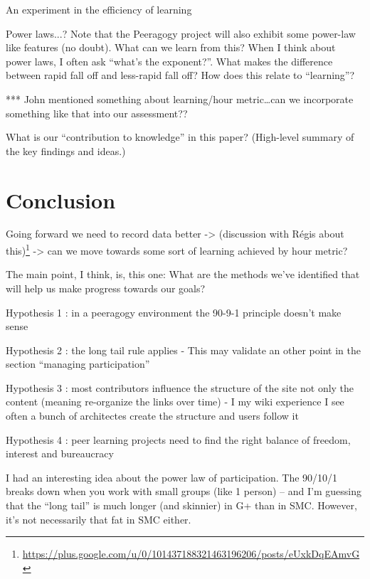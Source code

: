 \documentclass{acm_proc_article-sp}
\begin{document}
    An experiment in the efficiency of learning

        Power laws...? Note that the Peeragogy project will also exhibit some power-law like features (no doubt). What can we learn from this? When I think about power laws, I often ask ``what's the exponent?''. What makes the difference between rapid fall off and less-rapid fall off? How does this relate to ``learning''?

*** John mentioned something about learning/hour metric\ldots can we incorporate something like that into our assessment??

        What is our ``contribution to knowledge'' in this paper? (High-level summary of the key findings and ideas.)\cite{paragogy}
\cite{Origins}
\cite{Tales}
\cite{Peeragogy-2}
\cite{College}
\cite{Bridges}
\cite{peer}
\cite{Gluing}
\cite{GroupInformatics}
\cite{Why}
\cite{PeeragogyinAction}

%
%
%
%

\section{Conclusion}

Going forward we need to record data better -> (discussion with R\'egis about this)\footnote{\url{https://plus.google.com/u/0/101437188321463196206/posts/eUxkDqEAmvG}} -> can we move towards some sort of learning achieved by hour metric?

    The main point, I think, is, this one: What are the methods we've identified that will help us make progress towards our goals?

                Hypothesis 1 : in a peeragogy environment the 90-9-1 principle doesn't make sense

                Hypothesis 2 : the long tail rule applies - This may validate an other point in the section ``managing participation''

                Hypothesis 3 : most contributors influence the structure of the site not only the content (meaning re-organize the links over time) - I my wiki experience I see often a bunch of architectes create the structure and users follow it

                Hypothesis 4 : peer learning projects need to find the right balance of freedom, interest and bureaucracy

        I had an interesting idea about the power law of participation. The 90/10/1 breaks down when you work with small groups (like 1 person) -- and I'm guessing that the ``long tail'' is much longer (and skinnier) in G+ than in SMC. However, it's not necessarily that fat in SMC either.
\end{document}
